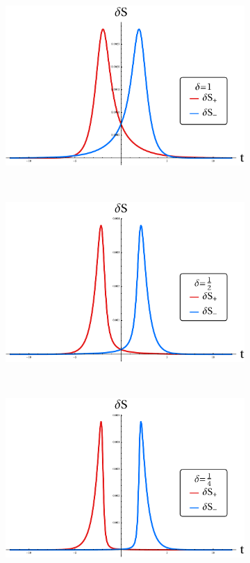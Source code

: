 \documentclass[12pt]{article}
\numberwithin{equation}{section}
\begin{document}
\begin{spacing}{1.1}
\begin{figure}[h!]
    \centering
    \begin{subfigure}[b]{0.4\textwidth}
        \includegraphics[width=\textwidth]{figures/delta_1.pdf}
        \caption{}
        \label{fig:}
    \end{subfigure}
~
    \begin{subfigure}[b]{0.4\textwidth}
        \includegraphics[width=\textwidth]{figures/delta_1_2.pdf}
        \caption{}
        \label{fig:}
    \end{subfigure}
  ~
    \begin{subfigure}[b]{0.4\textwidth}
        \includegraphics[width=\textwidth]{figures/delta_1_4.pdf}

\end{subfigure}
\end{figure}
\end{spacing}
\end{document}
